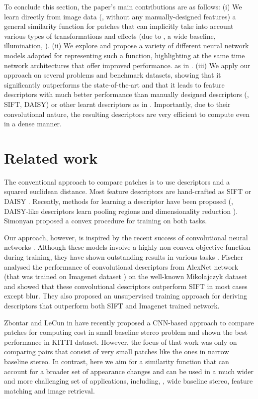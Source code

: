\documentclass[10pt,twocolumn,letterpaper]{article}
\begin{document}
To conclude this section, the paper's main contributions  are as follows:
(i) We learn directly from image data (\ie, without any manually-designed features) a  general similarity function  for patches that can implicitly take into account various types of transformations and effects (due to \eg, a wide baseline, illumination, \etc). (ii) We  explore and propose a variety of different neural network models adapted for  representing such a function, highlighting  at the same time network architectures 
that  offer improved  performance. 
  as in \cite{Simonyan14}.
(iii) We apply our approach on several problems and benchmark datasets, showing that it significantly outperforms the state-of-the-art and that it leads to feature descriptors  with much better performance than manually designed descriptors  (\eg, SIFT, DAISY) or     other learnt descriptors
  as in \cite{Simonyan14}. Importantly, due to their convolutional nature, the resulting descriptors are very efficient to compute even in a dense manner.
  
  
\section{Related work}

The conventional approach to compare patches is to use descriptors and a squared euclidean distance. Most feature descriptors
are hand-crafted as SIFT \cite{LoweSift} or DAISY \cite{Tola08}. Recently, methods for learning a descriptor have been proposed \cite{Trzcinski12} (\eg, DAISY-like descriptors learn pooling regions and dimensionality reduction \cite{BHW10}). Simonyan \etal 
\cite{Simonyan14} proposed a convex procedure for training on both tasks.

Our approach, however, is inspired by the recent success of convolutional neural networks \cite{Razavian, deepface, Szegedy, depth_map}. Although these models   involve 
a highly non-convex  objective function during training, they have shown outstanding results in various tasks \cite{Razavian}. Fischer \etal \cite{comparison} analysed the performance of convolutional descriptors from AlexNet 
network (that was trained on Imagenet dataset \cite{kriz2012}) on the well-known Mikolajczyk dataset \cite{MS05} 
and showed that these convolutional descriptors outperform SIFT in most cases except blur. They also 
proposed an unsupervised training approach for deriving descriptors that outperform both SIFT and Imagenet trained network.

Zbontar and LeCun in \cite{Zbontar} have recently proposed a CNN-based approach to compare patches 
for computing cost in small baseline stereo problem and shown the best performance in KITTI dataset. 
However, the focus of that work was   only on comparing pairs that consist of very small patches like the ones in narrow baseline stereo. In contrast, here we aim for a   similarity function that can account for a broader set of appearance changes  and can be used in a much wider and more challenging set of applications, including, \eg, wide baseline stereo, 
feature matching and image retrieval.
\end{document}
